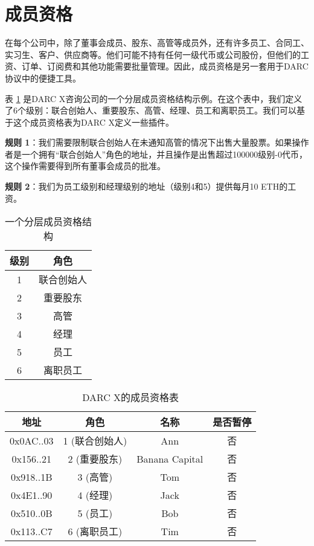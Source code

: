 \documentclass[main.tex]{subfiles}
\begin{document}
\section{成员资格}

在每个公司中，除了董事会成员、股东、高管等成员外，还有许多员工、合同工、实习生、客户、供应商等。他们可能不持有任何一级代币或公司股份，但他们的工资、订单、订阅费和其他功能需要批量管理。因此，成员资格是另一套用于DARC协议中的便捷工具。

表 \ref{table:1} 是DARC X咨询公司的一个分层成员资格结构示例。在这个表中，我们定义了6个级别：联合创始人、重要股东、高管、经理、员工和离职员工。我们可以基于这个成员资格表为DARC X定义一些插件。

\textbf{规则 1}：我们需要限制联合创始人在未通知高管的情况下出售大量股票。如果操作者是一个拥有“联合创始人”角色的地址，并且操作是出售超过100000级别-0代币，这个操作需要得到所有董事会成员的批准。

\textbf{规则 2}：我们为员工级别和经理级别的地址（级别4和5）提供每月10 ETH的工资。

\begin{table}[h!]
\centering
\begin{tabular}{||c c||} 
 \hline
 级别 & 角色 \\ [0.5ex] 
 \hline\hline
 1 & 联合创始人 \\ 
 2 & 重要股东 \\
 3 & 高管 \\
 4 & 经理 \\
 5 & 员工 \\
 6 & 离职员工 \\ [1ex] 
 \hline
\end{tabular}
\caption{一个分层成员资格结构}
\label{table:1}
\end{table}

\begin{table}[h!]
\centering
\begin{tabular}{||c c c c||} 
 \hline
 地址 & 角色 & 名称 & 是否暂停 \\ [0.5ex] 
 \hline\hline
 0x0AC..03 & 1 (联合创始人) & Ann & 否 \\
 0x156..21 & 2 (重要股东) & Banana Capital & 否 \\
 0x918..1B & 3 (高管) & Tom & 否 \\
 0x4E1..90 & 4 (经理) & Jack & 否 \\
 0x510..0B & 5 (员工) & Bob & 否 \\
 0x113..C7 & 6 (离职员工) & Tim & 否 \\ [1ex] 
 \hline
\end{tabular}
\caption{DARC X的成员资格表}
\label{table:2}
\end{table}
\end{document}
